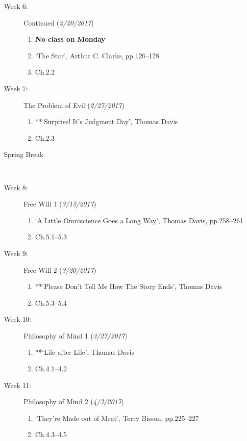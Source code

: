 \documentclass[article,oneside]{memoir}
\begin{document}
\begin{description}
\item[Week 6:] Continued (\emph{2/20/2017})
\begin{enumerate}
\item \textbf{No class on Monday}
\item `The Star', Arthur C. Clarke, pp.126--128
\item Ch.2.2
\end{enumerate}

\item[Week 7:] The Problem of Evil  (\emph{2/27/2017})
\begin{enumerate}
\item **`Surprise! It's Judgment Day', Thomas Davis
\item Ch.2.3
\end{enumerate}

\item[Spring Break]\



\item[Week 8:] Free Will 1 (\emph{3/13/2017})
\begin{enumerate}
\item `A Little Omniscience Goes a Long Way', Thomas Davis, pp.258--261
\item Ch.5.1--5.3
\end{enumerate}

\item[Week 9:] Free Will 2 (\emph{3/20/2017})
\begin{enumerate}
\item **`Please Don't Tell Me How The Story Ends', Thomas Davis
\item Ch.5.3--5.4
\end{enumerate}


\item[Week 10:] Philosophy of Mind 1 (\emph{3/27/2017})
\begin{enumerate}
\item **`Life after Life', Thomas Davis
\item Ch.4.1--4.2
\end{enumerate}

\item[Week 11:] Philosophy of Mind 2 (\emph{4/3/2017})
\begin{enumerate}
\item `They're Made out of Meat', Terry Bisson, pp.225--227
\item Ch.4.3--4.5
\end{enumerate}



\end{description}
\end{document}
